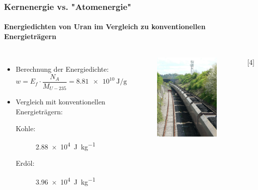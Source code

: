 \documentclass{beamer}[9pt]
\begin{document}
\begin{frame}
\frametitle{Kernenergie vs. "Atomenergie"}
\framesubtitle{Energiedichten von Uran im Vergleich zu konventionellen Energieträgern}
\begin{columns}
\begin{itemize}
\item Berechnung der Energiedichte:
\[
w = E_f \cdot \frac{ N_A }{M_{U-235}} = \SI{8.81e10}{\joule\per\gram}
\]
\item Vergleich mit konventionellen Energieträgern:\\

\begin{description}

\item[ Kohle:] \SI{2.88e4}{\joule\per\kg}
\item[Erdöl:] \SI{3.96e4}{\joule\per\kg}

\end{description}
\end{itemize}
\begin{figure}[htp]
\includegraphics[scale=.15]{coal.jpg}
\end{figure}
\hspace{.5\columnwidth}[4]
\end{columns}
\end{frame}
\end{document}
